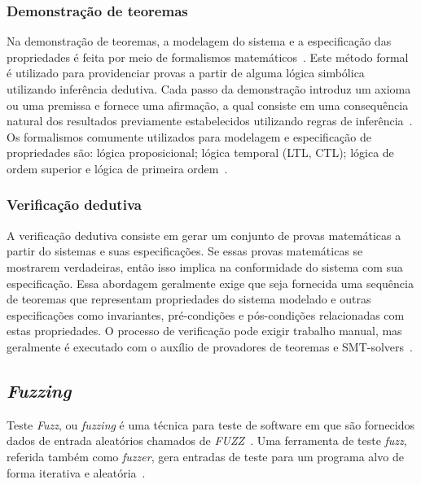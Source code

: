 \subsubsection*{\textbf{Demonstração de teoremas}}

Na demonstração de teoremas, a modelagem do sistema e a especificação das propriedades é feita por meio de formalismos matemáticos~\cite{almakhour2020verification-survey}. Este método formal é utilizado para providenciar provas a partir de alguma lógica simbólica utilizando inferência dedutiva. Cada passo da demonstração introduz um axioma ou uma premissa e fornece uma afirmação, a qual consiste em uma consequência natural dos resultados previamente estabelecidos utilizando regras de inferência~\cite{singh2020survey-vulnerabilities-elsevier}. Os formalismos comumente utilizados para modelagem e especificação de propriedades são: lógica proposicional; lógica temporal (LTL, CTL); lógica de ordem superior e lógica de primeira ordem~\cite{harrison2008theorem, sun2020formal-03, yang2019fether-38, li2019formal-43}. 

\subsubsection*{\textbf{Verificação dedutiva}}

A verificação dedutiva consiste em gerar um conjunto de provas matemáticas a partir do sistemas e suas especificações. Se essas provas matemáticas se mostrarem verdadeiras, então isso implica na conformidade do sistema com sua especificação. Essa abordagem geralmente exige que seja fornecida uma sequência de teoremas que representam propriedades do sistema modelado e outras especificações como invariantes, pré-condições e pós-condições relacionadas com estas propriedades. O processo de verificação pode exigir trabalho manual, mas geralmente é executado com o auxílio de provadores de teoremas e SMT-solvers~\cite{ahrendt2016deductive-keybook, park2018formal-05, beillahi2020behavioral-15}. 


\subsection{\textit{Fuzzing}} \label{tex:fund:fuzzing}

Teste \textit{Fuzz}, ou \textit{fuzzing} é uma técnica para teste de software em que são fornecidos dados de entrada aleatórios chamados de \textit{FUZZ}~\cite{almakhour2020verification-survey}. Uma ferramenta de teste \textit{fuzz}, referida também como \textit{fuzzer}, gera entradas de teste para um programa alvo de forma iterativa e aleatória~\cite{klees2018fuzz-evaluating}.


